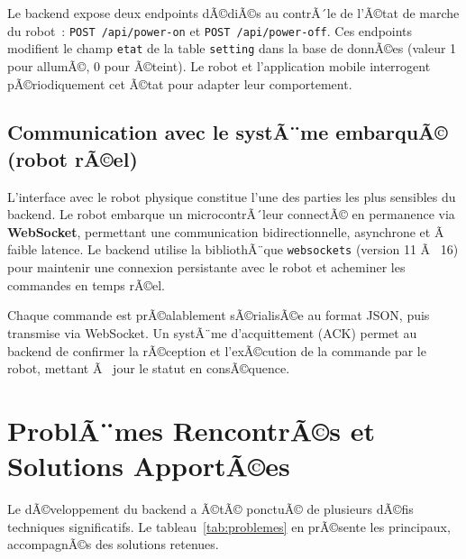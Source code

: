 Le backend expose deux endpoints dÃ©diÃ©s au contrÃ´le de l'Ã©tat
de marche du robot~: \texttt{POST /api/power-on} et
\texttt{POST /api/power-off}. Ces endpoints modifient le champ
\texttt{etat} de la table \texttt{setting} dans la base de donnÃ©es
(valeur 1 pour allumÃ©, 0 pour Ã©teint). Le robot et l'application
mobile interrogent pÃ©riodiquement cet Ã©tat pour adapter leur
comportement.

\subsection{Communication avec le systÃ¨me embarquÃ© (robot rÃ©el)}

L'interface avec le robot physique constitue l'une des parties
les plus sensibles du backend. Le robot embarque un
microcontrÃ´leur connectÃ© en permanence via \textbf{WebSocket},
permettant une communication bidirectionnelle, asynchrone et Ã 
faible latence. Le backend utilise la bibliothÃ¨que
\texttt{websockets} (version 11 Ã  16) pour maintenir une
connexion persistante avec le robot et acheminer les commandes
en temps rÃ©el.

Chaque commande est prÃ©alablement sÃ©rialisÃ©e au format JSON,
puis transmise via WebSocket. Un systÃ¨me d'acquittement (ACK)
permet au backend de confirmer la rÃ©ception et l'exÃ©cution de
la commande par le robot, mettant Ã  jour le statut en consÃ©quence.
\section{ProblÃ¨mes RencontrÃ©s et Solutions ApportÃ©es}

Le dÃ©veloppement du backend a Ã©tÃ© ponctuÃ© de plusieurs dÃ©fis
techniques significatifs. Le tableau~\ref{tab:problemes} en
prÃ©sente les principaux, accompagnÃ©s des solutions retenues.

